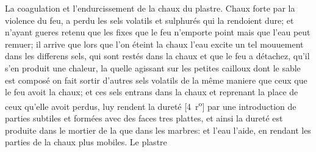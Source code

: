 %
\pend%
\pstart%
La \protect{}coagulation
%
et l'endurcissement\protect{} de la chaux\protect{} du plastre\protect{}. Chaux\protect{} forte par la violence du feu\protect{}, a perdu les sels\protect{} volatils et sulphur\'{e}s qui la rendoient dure; et n'ayant gueres retenu que les fixes que le feu\protect{} n'emporte point mais que l'eau\protect{} peut remuer; il arrive que lors que l'on \'{e}teint la chaux\protect{} l'eau \protect{}excite un tel mouuement dans les differens sels\protect{}, qui sont rest\'{e}s dans la chaux\protect{} et que le feu\protect{} a d\'{e}tachez, qu'il s'en produit une chaleur\protect{}, la quelle agissant sur les petites cailloux\protect{} dont le sable est compos\'{e} on fait sortir d'autres sels\protect{} volatils de la même maniere que ceux que le feu\protect{} avoit
 la chaux\protect{}; et ces sels\protect{} entrans dans la chaux\protect{} et reprenant la place de ceux qu'elle avoit perdus, luy rendent la \protect{}duret\'{e}
%
[4~r\textsuperscript{o}]
%
par une introduction de parties subtiles et formées avec des faces tres plattes,
et ainsi la \protect{}duret\'{e} est produite dans le mortier\protect{} de la
que dans les \protect{}marbres:
et l'eau l'aide, en rendant les parties de la chaux\protect{} plus mobiles.%
%
\pend%
\pstart%
Le \protect{}plastre
%
